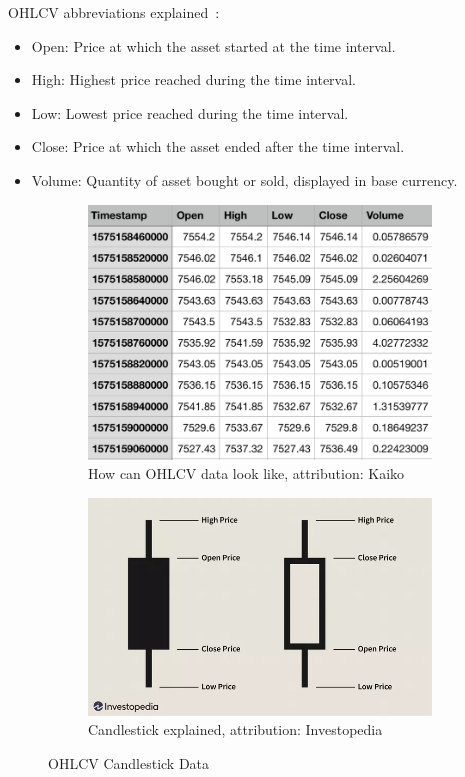 OHLCV abbreviations explained~\cite{kaiko-ohlcv}:
\begin{itemize}
    \item Open: Price at which the asset started at the time interval.
    \item High: Highest price reached during the time interval.
    \item Low: Lowest price reached during the time interval.
    \item Close: Price at which the asset ended after the time interval.
    \item Volume: Quantity of asset bought or sold, displayed in base currency.
\end{itemize}

\begin{figure}
    \centering
    \begin{subfigure}[t]{0.45\textwidth}
        \centering
        \includegraphics[width=\textwidth]{figures/OHLCV-data.png}
        \caption{How can OHLCV data look like, attribution: Kaiko~\cite{kaiko-ohlcv}}
        \label{OHLCV-figure}
    \end{subfigure}
    \hfill
    \begin{subfigure}[t]{0.45\textwidth}
        \centering
        \includegraphics[width=\textwidth]{figures/candlestick-data.png}
        \caption{Candlestick explained, attribution: Investopedia~\cite{investopedia:candlestick-charts}}
        \label{candlestick-figure}
    \end{subfigure}
    \caption{OHLCV Candlestick Data}
\end{figure}

